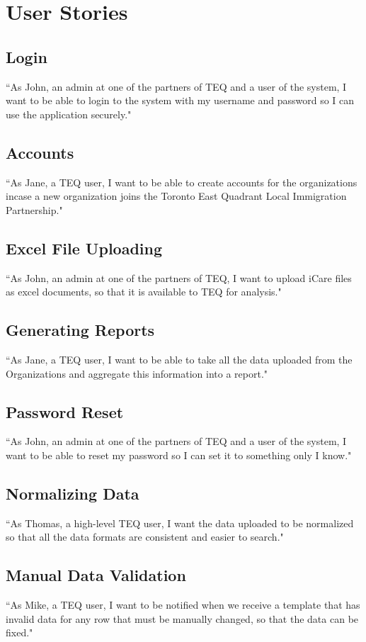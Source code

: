 \documentclass[12pt]{article}
\begin{document}
\pagebreak

\section{User Stories}
\subsection{Login} ``As John, an admin at one of the partners of TEQ and a user of the system, I want to be able to login to the system with my username and password so I can use the application securely."

\subsection{Accounts} ``As Jane, a TEQ user, I want to be able to create accounts for the organizations incase a new organization joins the Toronto East Quadrant Local Immigration Partnership."

\subsection{Excel File Uploading}
``As John, an admin at one of the partners of TEQ, I want to upload iCare files as excel documents, so that it is available to TEQ for analysis."

\subsection{Generating Reports}
``As Jane, a TEQ user,  I want to be able to take all the data uploaded from the Organizations and aggregate this information into a report."

\subsection{Password Reset}
``As John, an admin at one of the partners of TEQ and a user of the system, I want to be able to reset my password so I can set it to something only I know."

\subsection{Normalizing Data}
``As Thomas, a high-level TEQ user, I want the data uploaded to be normalized so that all the data formats are consistent and easier to search."

\subsection{Manual Data Validation}
``As Mike, a TEQ user, I want to be notified when we receive a template that has invalid data for any row that must be manually changed, so that the data can be fixed."
\end{document}
